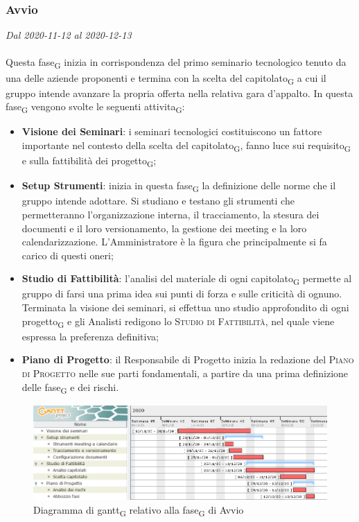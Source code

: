 \subsubsection{Avvio}

\textit{Dal 2020-11-12 al 2020-12-13}
\\\\
Questa fase\textsubscript{G} inizia in corrispondenza del primo seminario tecnologico tenuto da una delle aziende proponenti e termina con la scelta del capitolato\textsubscript{G} a cui il gruppo intende avanzare la propria offerta nella relativa gara d'appalto.
In questa fase\textsubscript{G} vengono svolte le seguenti attivita\textsubscript{G}:
\begin{itemize}
	\item \textbf{Visione dei Seminari}: i seminari tecnologici costituiscono un fattore importante nel contesto della scelta del capitolato\textsubscript{G}, fanno luce sui requisito\textsubscript{G} e sulla fattibilità dei progetto\textsubscript{G};
	\item \textbf{Setup Strumenti}: inizia in questa fase\textsubscript{G} la definizione delle norme che il gruppo intende adottare. Si studiano e testano gli strumenti che permetteranno l'organizzazione interna, il tracciamento, la stesura dei documenti e il loro versionamento, la gestione dei meeting e la loro calendarizzazione. L'Amministratore è la figura che principalmente si fa carico di questi oneri;
	\item \textbf{Studio di Fattibilità}: l'analisi del materiale di ogni capitolato\textsubscript{G} permette al gruppo di farsi una prima idea sui punti di forza e sulle criticità di ognuno. Terminata la visione dei seminari, si effettua uno studio approfondito di ogni progetto\textsubscript{G} e gli Analisti redigono lo \textsc{Studio di Fattibilità}, nel quale viene espressa la preferenza definitiva;
	\item \textbf{Piano di Progetto}: il Responsabile di Progetto inizia la redazione del \textsc{Piano di Progetto} nelle sue parti fondamentali, a partire da una prima definizione delle fase\textsubscript{G} e dei rischi.
\end{itemize}  


\begin{figure}[H]
	\centering
	\includegraphics[scale=0.62]{res/images/01_gantt_avvio.png}
	\caption{Diagramma di gantt\textsubscript{G} relativo alla fase\textsubscript{G} di Avvio}
\end{figure}




